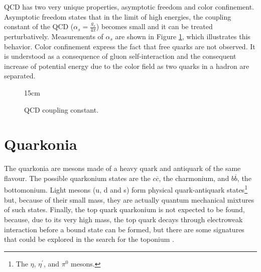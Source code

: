QCD has two very unique properties, asymptotic freedom and color confinement. Asymptotic freedom states that in the limit of high energies, the coupling constant of the QCD ($\alpha_s = \frac{g_s}{4\pi}$) becomes small \cite{PhysRevLett.30.1343, PhysRevLett.30.1346} and it can be treated perturbatively. Measurements of $\alpha_s$ are shown in Figure \ref{fig:couplingQCD}, which illustrates this behavior. Color confinement express the fact that free quarks are not observed. It is understood as a consequence of gluon self-interaction and the consequent increase of potential energy due to the color field as two quarks in a hadron are separated.

\begin{figure}[!htm]{15cm}
\caption{QCD coupling constant.}%
\label{fig:couplingQCD}
\end{figure}

\section{Quarkonia}

The quarkonia are mesons made of a heavy quark and antiquark of the same flavour. The possible quarkonium states are the $c\overline{c}$, the charmonium, and $b\overline{b}$, the bottomonium. Light mesons (u, d and s) form physical quark-antiquark states\footnote{The $\eta$, $\eta^\prime$, and $\pi^0$ mesons.} but, because of their small mass, they are actually quantum mechanical mixtures of such states. Finally, the top quark quarkonium is not expected to be found, because, due to its very high mass, the top quark decays through electroweak interaction before a bound state can be formed, but there are some signatures that could be explored in the search for the toponium \cite{Fuks:2021xje}.

